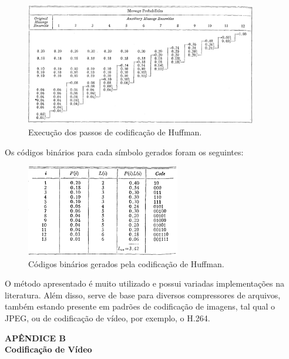 \documentclass[cic,tc]{iiufrgs}
\begin{document}
\begin{figure}[H]
    \caption{Execução dos passos de codificação de Huffman.}
    \begin{center}
        \includegraphics[width=0.9\textwidth]{img/huffmanprocess.png}
    \end{center}
\end{figure}

Os códigos binários para cada símbolo gerados foram os seguintes:
\begin{figure}[H]
    \caption{Códigos binários gerados pela codificação de Huffman.}
    \begin{center}
        \includegraphics[width=0.6\textwidth]{img/huffmantable.png}
    \end{center}
\end{figure}

O método apresentado é muito utilizado e possui variadas implementações na 
literatura.
Além disso, serve de base para diversos compressores de arquivos, também 
estando presente em padrões de codificação de imagens, tal qual o JPEG, 
ou de codificação de vídeo, por exemplo, o H.264.
\newpage
{
    \centering
    \textbf{APÊNDICE B} \\
    \textbf{Codificação de Vídeo} \par
}
\vspace{1em}
\end{document}
